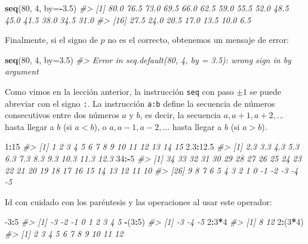 \documentclass[
]{book}
\newenvironment{Shaded}{\begin{snugshade}}{\end{snugshade}}
\newcommand{\CommentTok}[1]{\textcolor[rgb]{0.56,0.35,0.01}{\textit{#1}}}
\newcommand{\DataTypeTok}[1]{\textcolor[rgb]{0.13,0.29,0.53}{#1}}
\newcommand{\DecValTok}[1]{\textcolor[rgb]{0.00,0.00,0.81}{#1}}
\newcommand{\FloatTok}[1]{\textcolor[rgb]{0.00,0.00,0.81}{#1}}
\newcommand{\KeywordTok}[1]{\textcolor[rgb]{0.13,0.29,0.53}{\textbf{#1}}}
\newcommand{\NormalTok}[1]{#1}
\newcommand{\OperatorTok}[1]{\textcolor[rgb]{0.81,0.36,0.00}{\textbf{#1}}}
\theoremstyle{definition}
\theoremstyle{definition}
\theoremstyle{definition}
\theoremstyle{remark}
\begin{document}
\begin{Shaded}
\begin{Highlighting}[]
\KeywordTok{seq}\NormalTok{(}\DecValTok{80}\NormalTok{, }\DecValTok{4}\NormalTok{, }\DataTypeTok{by=}\OperatorTok{{-}}\FloatTok{3.5}\NormalTok{)}
\CommentTok{\#\textgreater{}  [1] 80.0 76.5 73.0 69.5 66.0 62.5 59.0 55.5 52.0 48.5 45.0 41.5 38.0 34.5 31.0}
\CommentTok{\#\textgreater{} [16] 27.5 24.0 20.5 17.0 13.5 10.0  6.5}
\end{Highlighting}
\end{Shaded}

Finalmente, si el signo de \(p\) no es el correcto, obtenemos un mensaje de error:

\begin{Shaded}
\begin{Highlighting}[]
\KeywordTok{seq}\NormalTok{(}\DecValTok{80}\NormalTok{, }\DecValTok{4}\NormalTok{, }\DataTypeTok{by=}\FloatTok{3.5}\NormalTok{)}
\CommentTok{\#\textgreater{} Error in seq.default(80, 4, by = 3.5): wrong sign in \textquotesingle{}by\textquotesingle{} argument}
\end{Highlighting}
\end{Shaded}

Como vimos en la lección anterior, la instrucción \texttt{seq} con paso \(\pm 1\) se puede abreviar con el signo \texttt{:}. La instrucción \texttt{a:b} define la secuencia de números consecutivos entre dos números \(a\) y \(b\), es decir, la secuencia \(a, a+1, a+2, \ldots\) hasta llegar a \(b\) (si \(a< b\)), o \(a, a-1, a-2, \ldots\) hasta llegar a \(b\) (si \(a> b\)).

\begin{Shaded}
\begin{Highlighting}[]
\DecValTok{1}\OperatorTok{:}\DecValTok{15}
\CommentTok{\#\textgreater{}  [1]  1  2  3  4  5  6  7  8  9 10 11 12 13 14 15}
\FloatTok{2.3}\OperatorTok{:}\FloatTok{12.5}
\CommentTok{\#\textgreater{}  [1]  2.3  3.3  4.3  5.3  6.3  7.3  8.3  9.3 10.3 11.3 12.3}
\DecValTok{34}\OperatorTok{:{-}}\DecValTok{5}
\CommentTok{\#\textgreater{}  [1] 34 33 32 31 30 29 28 27 26 25 24 23 22 21 20 19 18 17 16 15 14 13 12 11 10}
\CommentTok{\#\textgreater{} [26]  9  8  7  6  5  4  3  2  1  0 {-}1 {-}2 {-}3 {-}4 {-}5}
\end{Highlighting}
\end{Shaded}

Id con cuidado con los paréntesis y las operaciones al usar este operador:

\begin{Shaded}
\begin{Highlighting}[]
\DecValTok{{-}3}\OperatorTok{:}\DecValTok{5}
\CommentTok{\#\textgreater{} [1] {-}3 {-}2 {-}1  0  1  2  3  4  5}
\OperatorTok{{-}}\NormalTok{(}\DecValTok{3}\OperatorTok{:}\DecValTok{5}\NormalTok{)}
\CommentTok{\#\textgreater{} [1] {-}3 {-}4 {-}5}
\DecValTok{2}\OperatorTok{:}\DecValTok{3}\OperatorTok{*}\DecValTok{4}
\CommentTok{\#\textgreater{} [1]  8 12}
\DecValTok{2}\OperatorTok{:}\NormalTok{(}\DecValTok{3}\OperatorTok{*}\DecValTok{4}\NormalTok{)}
\CommentTok{\#\textgreater{}  [1]  2  3  4  5  6  7  8  9 10 11 12}
\end{Highlighting}
\end{Shaded}
\end{document}
